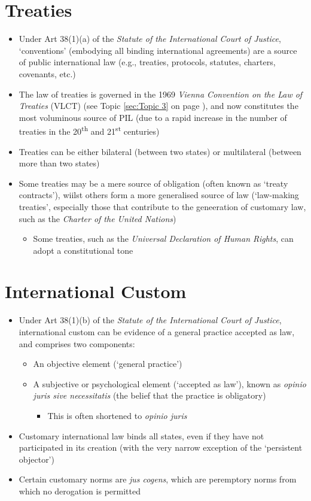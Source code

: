 \section{Treaties}
\begin{itemize}
    \item Under Art 38(1)(a) of the \textit{Statute of the International Court of Justice}, `conventions' (embodying all binding international agreements) are a source of public international law (e.g., treaties, protocols, statutes, charters, covenants, etc.)
    \item The law of treaties is governed in the 1969 \textit{Vienna Convention on the Law of Treaties} (VLCT) (see Topic \ref{sec:Topic 3} on page \pageref{sec:Topic 3}), and now constitutes the most voluminous source of PIL (due to a rapid increase in the number of treaties in the 20\textsuperscript{th} and 21\textsuperscript{st} centuries)
    \item Treaties can be either bilateral (between two states) or multilateral (between more than two states)
    \item Some treaties may be a mere source of obligation (often known as `treaty contracts'), wiilst others form a more generalised source of law (`law-making treaties', especially those that contribute to the geneeration of customary law, such as the \textit{Charter of the United Nations})
    \begin{itemize}
        \item Some treaties, such as the \textit{Universal Declaration of Human Rights}, can adopt a constitutional tone
    \end{itemize}
\end{itemize}

\section{International Custom}
\begin{itemize}
    \item Under Art 38(1)(b) of the \textit{Statute of the International Court of Justice}, international custom can be evidence of a general practice accepted as law, and comprises two components:
    \begin{itemize}
        \item An objective element (`general practice')
        \item A subjective or psychological element (`accepted as law'), known as \textit{opinio juris sive necessitatis} (the belief that the practice is obligatory)
        \begin{itemize}
            \item This is often shortened to \textit{opinio juris}
        \end{itemize}
    \end{itemize}
    \item Customary international law binds all states, even if they have not participated in its creation (with the very narrow exception of the `persistent objector')
    \item Certain customary norms are \textit{jus cogens}, which are peremptory norms from which no derogation is permitted
\end{itemize}

